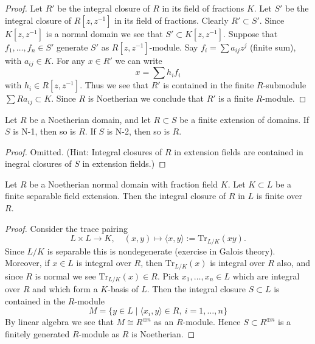 \begin{proof}
Let $R'$ be the integral closure of $R$ in its field of fractions $K$.
Let $S'$ be the integral closure of $R[z, z^{-1}]$ in its field of fractions.
Clearly $R' \subset S'$. 
Since $K[z, z^{-1}]$ is a normal domain we see that $S' \subset K[z, z^{-1}]$.
Suppose that $f_1, \ldots, f_n \in S'$ generate $S'$ as $R[z, z^{-1}]$-module.
Say $f_i = \sum a_{ij}z^j$ (finite sum), with $a_{ij} \in K$.
For any $x \in R'$ we can write
$$
x = \sum h_i f_i
$$
with $h_i \in R[z, z^{-1}]$. Thus we see that $R'$ is contained in the
finite $R$-submodule $\sum Ra_{ij} \subset K$. Since $R$ is Noetherian
we conclude that $R'$ is a finite $R$-module.
\end{proof}

\begin{lemma}
\label{lemma-finite-extesion-N-2}
Let $R$ be a Noetherian domain, and let $R \subset S$ be a
finite extension of domains. If $S$ is N-1, then so is $R$.
If $S$ is N-2, then so is $R$.
\end{lemma}

\begin{proof}
Omitted. (Hint: Integral closures of $R$ in extension fields
are contained in inegral closures of $S$ in extension fields.)
\end{proof}

\begin{lemma}
\label{lemma-Noetherian-normal-domain-finite-separable-extension}
Let $R$ be a Noetherian normal domain with fraction field $K$.
Let $K \subset L$ be a finite separable field extension.
Then the integral closure of $R$ in $L$ is finite over $R$.
\end{lemma}

\begin{proof}
Consider the trace pairing
$$
L \times L \longrightarrow K,
\quad (x, y) \longmapsto \langle x, y\rangle := \text{Tr}_{L/K}(xy).
$$
Since $L/K$ is separable this is nondegenerate (exercise in Galois theory).
Moreover, if $x \in L$ is integral over $R$, then
$\text{Tr}_{L/K}(x)$ is integral over $R$ also, and since $R$ is
normal we see $\text{Tr}_{L/K}(x) \in R$.
Pick $x_1, \ldots, x_n \in L$ which are integral over $R$
and which form a $K$-basis of $L$. Then the integral closure
$S \subset L$ is contained in the $R$-module
$$
M = \{y \in L \mid \langle x_i, y\rangle \in R,\ i = 1, \ldots, n\}
$$
By linear algebra we see that $M \cong R^{\oplus n}$ as an $R$-module.
Hence $S \subset R^{\oplus n}$ is a finitely generated $R$-module
as $R$ is Noetherian.
\end{proof}


